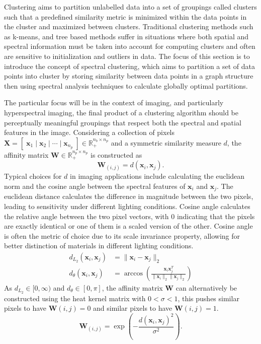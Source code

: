 Clustering aims to partition unlabelled data into a set of groupings called clusters such that a predefined similarity metric is minimized within the data points in the cluster and maximized between clusters. Traditional clustering methods such as k-means, and tree based methods suffer in situations where both spatial and spectral information must be taken into account for computing clusters and often are sensitive to initialization and outliers in data. The focus of this section is to introduce the concept of spectral clustering, which aims to partition a set of data points into cluster by storing similarity between data points in a graph structure then using spectral analysis techniques to calculate globally optimal partitions. 

The particular focus will be in the context of imaging, and particularly hyperspectral imaging, the final product of a clustering algorithm should be perceptually meaningful groupings that respect both the spectral and spatial features in the image. Considering a collection of pixels $\mathbf{X} = [\; \mathbf{x}_1 \;|\; \mathbf{x}_2 \;|\; \cdots \;|\; \mathbf{x}_{n_p} \;] \in \mathbb{R}_ +^{n_b \times n_p}$ and a symmetric similarity measure $d$, the affinity matrix $\mathbf{W} \in \mathbb{R}_ +^{n_p \times n_p}$ is constructed as
\begin{equation}
    \label{sc:affinity-mtx}
    \mathbf{W}_{(i,j)} = d(\mathbf{x}_i, \mathbf{x}_j).
\end{equation}
Typical choices for $d$ in imaging applications include calculating the euclidean norm and the cosine angle between the spectral features of $\mathbf{x}_i$ and $\mathbf{x}_j$. The euclidean distance calculates the difference in magnitude between the two pixels, leading to sensitivity under different lighting conditions. Cosine angle calculates the relative angle between the two pixel vectors, with $0$ indicating that the pixels are exactly identical or one of them is a scaled version of the other. Cosine angle is often the metric of choice due to its scale invariance property, allowing for better distinction of materials in different lighting conditions.
\begin{equation}
    \label{sc:affinity-measures}
    \begin{aligned}
        d_{L_2}(\mathbf{x}_i, \mathbf{x}_j) &= \| \mathbf{x}_i -\mathbf{x}_j \|_2
        \\
        d_{\theta}(\mathbf{x}_i, \mathbf{x}_j) &= \arccos\left(\frac{\mathbf{x}_i\mathbf{x}_j^T }{\|\mathbf{x}_i\|_2\|\mathbf{x}_j\|_2}\right)
    \end{aligned}
\end{equation}
As $d_{L_2} \in [0,\infty)$ and $d_\theta \in [0, \pi]$, the affinity matrix $\mathbf{W}$ can alternatively be constructed using the heat kernel matrix with $0 < \sigma < 1$, this pushes similar pixels to have $\mathbf{W}(i,j) = 0$ and similar pixels to have $\mathbf{W}(i,j) = 1$. 
\begin{equation}
    \label{sc:affinity-type-2}
    \mathbf{W}_{(i,j)} = \exp\left(-\frac{d(\mathbf{x}_i,\mathbf{x}_j)^2}{\sigma^2}\right).
\end{equation}

